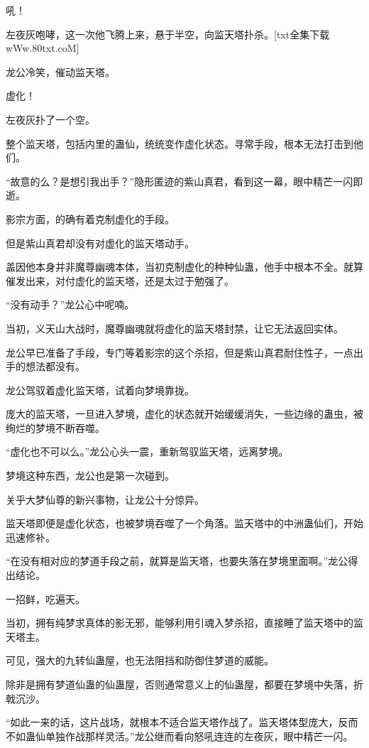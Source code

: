 
\begin{this_body}

吼！

左夜灰咆哮，这一次他飞腾上来，悬于半空，向监天塔扑杀。[txt全集下载wWw.80txt.coM]

龙公冷笑，催动监天塔。

虚化！

左夜灰扑了一个空。

整个监天塔，包括内里的蛊仙，统统变作虚化状态。寻常手段，根本无法打击到他们。

“故意的么？是想引我出手？”隐形匿迹的紫山真君，看到这一幕，眼中精芒一闪即逝。

影宗方面，的确有着克制虚化的手段。

但是紫山真君却没有对虚化的监天塔动手。

盖因他本身并非魔尊幽魂本体，当初克制虚化的种种仙蛊，他手中根本不全。就算催发出来，对付虚化的监天塔，还是太过于勉强了。

“没有动手？”龙公心中呢喃。

当初，义天山大战时，魔尊幽魂就将虚化的监天塔封禁，让它无法返回实体。

龙公早已准备了手段，专门等着影宗的这个杀招，但是紫山真君耐住性子，一点出手的想法都没有。

龙公驾驭着虚化监天塔，试着向梦境靠拢。

庞大的监天塔，一旦进入梦境，虚化的状态就开始缓缓消失，一些边缘的蛊虫，被绚烂的梦境不断吞噬。

“虚化也不可以么。”龙公心头一震，重新驾驭监天塔，远离梦境。

梦境这种东西，龙公也是第一次碰到。

关乎大梦仙尊的新兴事物，让龙公十分惊异。

监天塔即便是虚化状态，也被梦境吞噬了一个角落。监天塔中的中洲蛊仙们，开始迅速修补。

“在没有相对应的梦道手段之前，就算是监天塔，也要失落在梦境里面啊。”龙公得出结论。

一招鲜，吃遍天。

当初，拥有纯梦求真体的影无邪，能够利用引魂入梦杀招，直接睡了监天塔中的监天塔主。

可见，强大的九转仙蛊屋，也无法阻挡和防御住梦道的威能。

除非是拥有梦道仙蛊的仙蛊屋，否则通常意义上的仙蛊屋，都要在梦境中失落，折戟沉沙。

“如此一来的话，这片战场，就根本不适合监天塔作战了。监天塔体型庞大，反而不如蛊仙单独作战那样灵活。”龙公继而看向怒吼连连的左夜灰，眼中精芒一闪。


\end{this_body}

